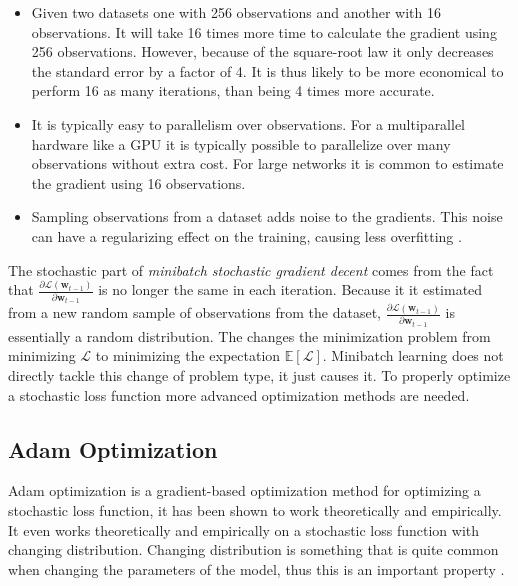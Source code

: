 \begin{itemize}
\item Given two datasets one with 256 observations and another with 16 observations. It will take 16 times more time to calculate the gradient using 256 observations. However, because of the square-root law it only decreases the standard error by a factor of 4. It is thus likely to be more economical to perform 16 as many iterations, than being 4 times more accurate.

\item It is typically easy to parallelism over observations. For a multiparallel hardware like a GPU it is typically possible to parallelize over many observations without extra cost. For large networks it is common to estimate the gradient using 16 observations.

\item Sampling observations from a dataset adds noise to the gradients. This noise can have a regularizing effect on the training, causing less overfitting \cite{deep-learning}.
\end{itemize}

The stochastic part of \textit{minibatch stochastic gradient decent} comes from the fact that $\frac{\partial \mathcal{L}(\mathbf{w}_{t-1})}{\partial \mathbf{w}_{t-1}}$ is no longer the same in each iteration. Because it it estimated from a new random sample of observations from the dataset, $\frac{\partial \mathcal{L}(\mathbf{w}_{t-1})}{\partial \mathbf{w}_{t-1}}$ is essentially a random distribution. The changes the minimization problem from minimizing $\mathcal{L}$ to minimizing the expectation $\mathbb{E}[\mathcal{L}]$. Minibatch learning does not directly tackle this change of problem type, it just causes it. To properly optimize a stochastic loss function more advanced optimization methods are needed.

\subsection{Adam Optimization}

Adam optimization is a gradient-based optimization method for optimizing a stochastic loss function, it has been shown to work theoretically and empirically. It even works theoretically and empirically on a stochastic loss function with changing distribution. Changing distribution is something that is quite common when changing the parameters of the model, thus this is an important property \cite{adam-optimization}.

